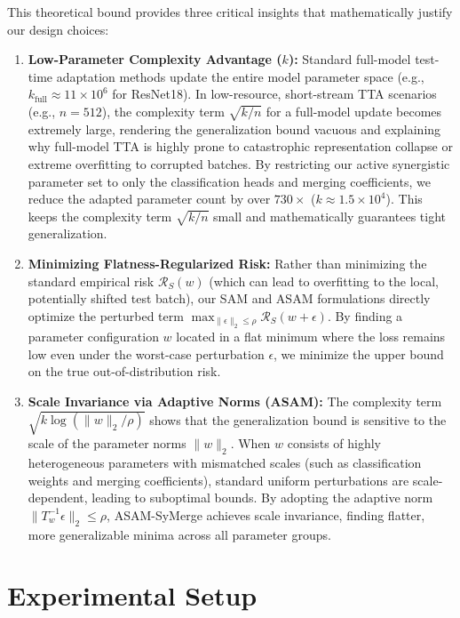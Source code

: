 \documentclass{article}
\begin{document}
This theoretical bound provides three critical insights that mathematically justify our design choices:
\begin{enumerate}
    \item \textbf{Low-Parameter Complexity Advantage ($k$):} Standard full-model test-time adaptation methods update the entire model parameter space (e.g., $k_{\text{full}} \approx 11 \times 10^6$ for ResNet18). In low-resource, short-stream TTA scenarios (e.g., $n = 512$), the complexity term $\sqrt{k/n}$ for a full-model update becomes extremely large, rendering the generalization bound vacuous and explaining why full-model TTA is highly prone to catastrophic representation collapse or extreme overfitting to corrupted batches. By restricting our active synergistic parameter set to only the classification heads and merging coefficients, we reduce the adapted parameter count by over $730\times$ ($k \approx 1.5 \times 10^4$). This keeps the complexity term $\sqrt{k/n}$ small and mathematically guarantees tight generalization.
    \item \textbf{Minimizing Flatness-Regularized Risk:} Rather than minimizing the standard empirical risk $\mathcal{R}_S(w)$ (which can lead to overfitting to the local, potentially shifted test batch), our SAM and ASAM formulations directly optimize the perturbed term $\max_{\|\epsilon\|_2 \le \rho} \mathcal{R}_S(w + \epsilon)$. By finding a parameter configuration $w$ located in a flat minimum where the loss remains low even under the worst-case perturbation $\epsilon$, we minimize the upper bound on the true out-of-distribution risk.
    \item \textbf{Scale Invariance via Adaptive Norms (ASAM):} The complexity term $\sqrt{k \log( \|w\|_2 / \rho )}$ shows that the generalization bound is sensitive to the scale of the parameter norms $\|w\|_2$. When $w$ consists of highly heterogeneous parameters with mismatched scales (such as classification weights and merging coefficients), standard uniform perturbations are scale-dependent, leading to suboptimal bounds. By adopting the adaptive norm $\|T_w^{-1} \epsilon\|_2 \le \rho$, ASAM-SyMerge achieves scale invariance, finding flatter, more generalizable minima across all parameter groups.
\end{enumerate}

\section{Experimental Setup}
\label{sec:setup}
\end{document}
